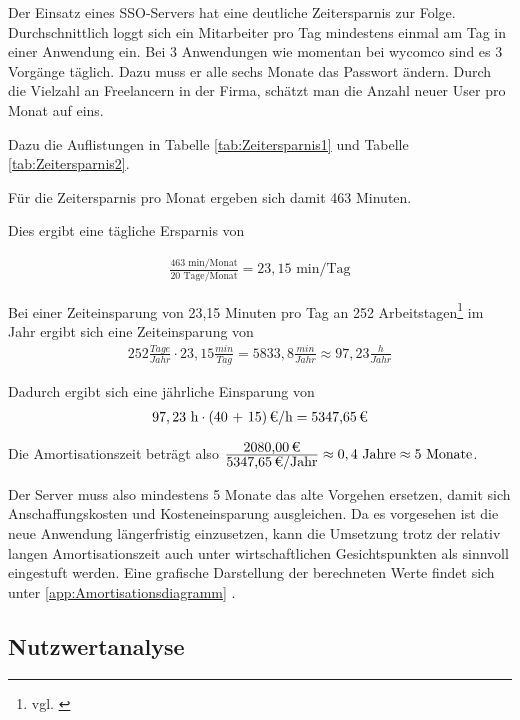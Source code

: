 Der Einsatz eines \ac{SSO}-Servers hat eine deutliche Zeitersparnis zur Folge. Durchschnittlich loggt sich ein Mitarbeiter pro Tag mindestens einmal am Tag in einer Anwendung ein. Bei 3 Anwendungen wie momentan bei wycomco sind es 3 Vorgänge täglich. Dazu muss er alle sechs Monate das Passwort ändern. Durch die Vielzahl an Freelancern in der Firma, schätzt man die Anzahl neuer User pro Monat auf eins. 

Dazu die Auflistungen in Tabelle \ref{tab:Zeitersparnis1} und Tabelle \ref{tab:Zeitersparnis2}.



Für die Zeitersparnis pro Monat ergeben sich damit 463 Minuten. 

Dies ergibt eine tägliche Ersparnis von

\begin{eqnarray}
\frac{463 \mbox{ min/Monat}}{20 \mbox{ Tage/Monat}} = 23,15 \mbox{ min/Tag}
\end{eqnarray}

Bei einer Zeiteinsparung von 23,15 Minuten pro Tag an 252 Arbeitstagen\footnote{vgl. \cite{arbeitstage}} im Jahr ergibt sich eine Zeiteinsparung von 
\begin{eqnarray}
252 \frac{Tage}{Jahr} \cdot 23,15 \frac{min}{Tag} = 5833,8 \frac{min}{Jahr} \approx 97,23 \frac{h}{Jahr} 
\end{eqnarray}

Dadurch ergibt sich eine jährliche Einsparung von 
\begin{eqnarray}
97,23 \mbox{ h} \cdot \eur{(40 + 15)}{\mbox{/h}} = \eur{5347,65}
\end{eqnarray}

Die Amortisationszeit beträgt also $\frac{\eur{2080,00}}{\eur{5347,65}\mbox{/Jahr}} \approx 0,4 \mbox{ Jahre} \approx 5 \mbox{ Monate}$.

Der Server muss also mindestens 5 Monate das alte Vorgehen ersetzen, damit sich Anschaffungskosten und Kosteneinsparung ausgleichen. Da es vorgesehen ist die neue Anwendung längerfristig einzusetzen, kann die Umsetzung trotz der relativ langen Amortisationszeit auch unter wirtschaftlichen Gesichtspunkten als sinnvoll eingestuft werden.
Eine grafische Darstellung der berechneten Werte findet sich unter \ref{app:Amortisationsdiagramm} .

\subsection{Nutzwertanalyse}
\label{sec:Nutzwertanalyse}

